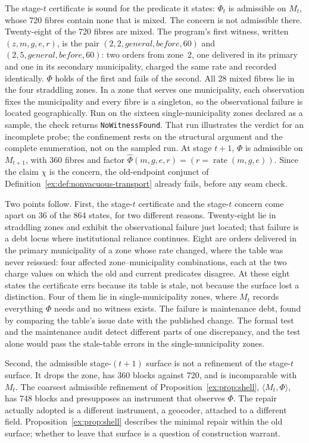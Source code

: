 \documentclass[smallextended,envcountsect,envcountsame,natbib]{svjour3}
\newcommand{\code}[1]{\texttt{#1}}
\begin{document}
The stage-$t$ certificate is sound for the predicate it states: $\Phi_t$ is admissible on $M_t$, whose 720 fibres contain none that is mixed. The concern is not admissible there. Twenty-eight of the 720 fibres are mixed. The program's first witness, written $(z,m,g,e,r)$, is the pair $(2,2,\mathit{general},\mathit{before},60)$ and $(2,5,\mathit{general},\mathit{before},60)$: two orders from zone~2, one delivered in its primary and one in its secondary municipality, charged the same rate and recorded identically. $\Phi$ holds of the first and fails of the second. All 28 mixed fibres lie in the four straddling zones. In a zone that serves one municipality, each observation fixes the municipality and every fibre is a singleton, so the observational failure is located geographically. Run on the sixteen single-municipality zones declared as a sample, the check returns \code{NoWitnessFound}. That run illustrates the verdict for an incomplete probe; the confinement rests on the structural argument and the complete enumeration, not on the sampled run. At stage $t+1$, $\Phi$ is admissible on $M_{t+1}$, with 360 fibres and factor $\widehat\Phi(m,g,e,r)=(r=\operatorname{rate}(m,g,e))$. Since the claim $\chi$ is the concern, the old-endpoint conjunct of Definition~\ref{ex:def:nonvacuous-transport} already fails, before any seam check.

Two points follow. First, the stage-$t$ certificate and the stage-$t$ concern come apart on 36 of the 864 states, for two different reasons. Twenty-eight lie in straddling zones and exhibit the observational failure just located; that failure is a debt locus where institutional reliance continues. Eight are orders delivered in the primary municipality of a zone whose rate changed, where the table was never reissued: four affected zone--municipality combinations, each at the two charge values on which the old and current predicates disagree. At these eight states the certificate errs because its table is stale, not because the surface lost a distinction. Four of them lie in single-municipality zones, where $M_t$ records everything $\Phi$ needs and no witness exists. The failure is maintenance debt, found by comparing the table's issue date with the published change. The formal test and the maintenance audit detect different parts of one discrepancy, and the test alone would pass the stale-table errors in the single-municipality zones.

Second, the admissible stage-$(t+1)$ surface is not a refinement of the stage-$t$ surface. It drops the zone, has 360 blocks against 720, and is incomparable with $M_t$. The coarsest admissible refinement of Proposition~\ref{ex:prop:shell}, $\langle M_t,\Phi\rangle$, has 748 blocks and presupposes an instrument that observes $\Phi$. The repair actually adopted is a different instrument, a geocoder, attached to a different field. Proposition~\ref{ex:prop:shell} describes the minimal repair within the old surface; whether to leave that surface is a question of construction warrant.
\end{document}

